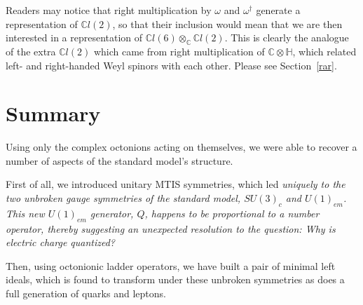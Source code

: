 \documentclass[letterpaper,12pt,titlepage,oneside,final]{book}
\newcommand{\C}{\mathbb{C}}
\newcommand{\CH}{\mathbb{C}\otimes\mathbb{H}}
\newcommand{\CO}{\mathbb{C}\otimes\mathbb{O}}
\newcommand{\RCHO}{\mathbb{R}\otimes\mathbb{C}\otimes\mathbb{H}\otimes\mathbb{O}}
\newcommand{\CLeight}{\mathbb{C}l(8)}
\newcommand{\CLsix}{\mathbb{C}l(6)}
\newcommand{\CLtwo}{\mathbb{C}l(2)}
\begin{document}
Readers may notice that right multiplication by $\omega$ and $\omega^{\dagger}$ generate a representation of $\CLtwo$, so that their inclusion would mean that we are then interested in a representation of $\CLsix\otimes_{\C}\CLtwo$.  This is clearly the analogue of the extra $\CLtwo$ which came from right multiplication  of $\CH$, which related left- and right-handed Weyl spinors with each other.   Please see Section~\ref{rar}.


\section{Summary  }

Using only the complex octonions acting on themselves, we were able to recover a number of aspects of the standard model's structure.

First of all, we introduced unitary MTIS symmetries, which led \it uniquely \rm to the two unbroken gauge symmetries of the standard model, $SU(3)_c$ and $U(1)_{em}$.  This new $U(1)_{em}$ generator, $Q$, happens to be proportional to a number operator, thereby suggesting an unexpected resolution to the question:  Why is electric charge quantized?

Then, using octonionic ladder operators, we have built a pair of minimal left ideals, which is found to transform under these unbroken symmetries  as does a full generation of quarks and leptons.  


\end{document}
